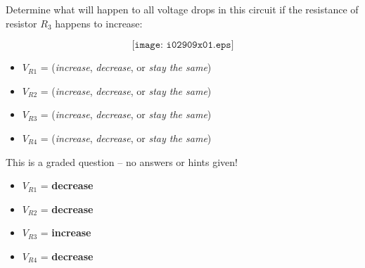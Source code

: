 

Determine what will happen to all voltage drops in this circuit if the resistance of resistor $R_3$ happens to increase:

$$\texttt{[image: i02909x01.eps]}$$

\begin{itemize}
\item{} $V_{R1}$ = ({\it increase}, {\it decrease}, or {\it stay the same})
\vskip 10pt
\item{} $V_{R2}$ = ({\it increase}, {\it decrease}, or {\it stay the same})
\vskip 10pt
\item{} $V_{R3}$ = ({\it increase}, {\it decrease}, or {\it stay the same})
\vskip 10pt
\item{} $V_{R4}$ = ({\it increase}, {\it decrease}, or {\it stay the same})
\end{itemize}

\vfil 

\eject






This is a graded question -- no answers or hints given!







\begin{itemize}
\item{} $V_{R1}$ = {\bf decrease}
\vskip 10pt
\item{} $V_{R2}$ = {\bf decrease}
\vskip 10pt
\item{} $V_{R3}$ = {\bf increase}
\vskip 10pt
\item{} $V_{R4}$ = {\bf decrease}
\end{itemize}




